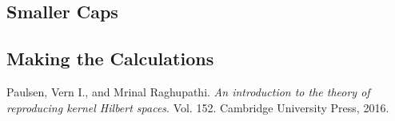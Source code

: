 \documentclass[twoside,11pt]{homework}
\begin{document}
\begin{multicols}{2}
\subsection{Smaller Caps}

\subsection{Making the Calculations}

\begin{thebibliography}{9}

 Paulsen, Vern I., and Mrinal Raghupathi. \emph{An introduction to the theory of reproducing kernel Hilbert spaces}. Vol. 152. Cambridge University Press, 2016. 

\end{thebibliography}

\end{multicols}
\end{document}
